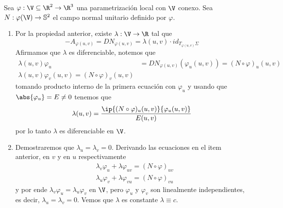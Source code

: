 \documentclass{article}
\begin{document}
\begin{dem}
    Sea $\varphi:\V\subseteq\R^{2}\to\R^{3}$ una parametrización local con $\V$ conexo. Sea 
    $N:\varphi(\V)\to\mathbb{S}^{2}$ el campo normal unitario definido por $\varphi$.
    \begin{enumerate}
        \item Por la propiedad anterior, existe $\lambda:\V\to\R$ tal que
        \begin{equation*}
            -A_{\varphi(u,v)}=DN_{\varphi(u,v)}=\lambda(u,v)\cdot id_{T_{\varphi(u,v)}\Sigma}
        \end{equation*}
        Afirmamos que $\lambda$ es diferenciable, notemos que
        \begin{align*}
            \lambda(u,v)\varphi_{u} &= DN_{\varphi(u,v)}(\varphi_{u}(u,v))=
            (N\circ\varphi)_{u}(u,v) \\
            \lambda(u,v)\varphi_{v}(u,v)=(N\circ\varphi)_{v}(u,v)
        \end{align*}
        tomando producto interno de la primera ecuación con $\varphi_{u}$ y usando que 
        $\abs{\varphi_{u}}=E\neq0$ tenemos que
        \begin{equation*}
            \lambda(u,v)=\frac{\ip{(N\circ\varphi)_{u}(u,v)}{\varphi_{u}(u,v)}}{E(u,v)}
        \end{equation*}
        por lo tanto $\lambda$ es diferenciable en $\V$.

        \item Demostraremos que $\lambda_{u}=\lambda_{v}=0$. Derivando las ecuaciones en el item 
        anterior, en $v$ y en $u$ respectivamente
        \begin{align*}
            & \lambda_{v}\varphi_{u}+\lambda\varphi_{uv}=(N\circ\varphi)_{uv} \\
            & \lambda_{u}\varphi_{v}+\lambda\varphi_{vu}=(N\circ\varphi)_{vu}
        \end{align*}
        y por ende $\lambda_{v}\varphi_{u}=\lambda_{u}\varphi_{v}$ en $\V$, pero $\varphi_{u}$ y
        $\varphi_{v}$ son linealmente independientes, es decir, $\lambda_{u}=\lambda_{v}=0$. Vemos
        que $\lambda$ es constante $\lambda\equiv c$.


\end{enumerate}
\end{dem}
\end{document}
